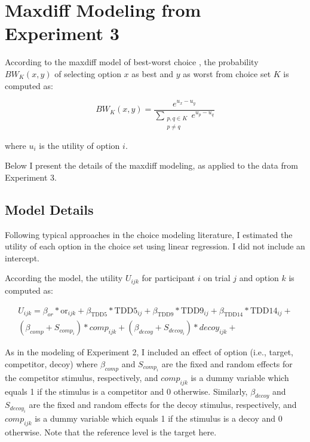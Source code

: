 \chapter{Maxdiff Modeling from Experiment 3}
According to the maxdiff model of best-worst choice \parencite{marleyProbabilisticModelsBest2005}, the probability $BW_{K}(x,y)$ of selecting option $x$ as best and $y$ as worst from choice set $K$ is computed as:

\begin{equation}
   BW_{K}(x,y)=\frac{e^{u_{x}-u_{y}}}{\sum_{\substack{{p,q}\in K\\p \neq q}} e^{u_{p}-u_{q}}}   
   \label{eqn:maxdiff_equation1}
\end{equation}

where $u_{i}$ is the utility of option $i$. 

Below I present the details of the maxdiff modeling, as applied to the data from Experiment 3.

\section{Model Details}
Following typical approaches in the choice modeling literature, I estimated the utility of each option in the choice set using linear regression. I did not include an intercept. 

According the model, the utility $U_{ijk}$ for participant $i$ on trial $j$ and option $k$ is computed as:

\begin{equation}
    \begin{aligned}
        U_{ijk}=\beta_{or}*\mathrm{or}_{ijk} + \beta_{\mathrm{TDD}5}*\mathrm{TDD}5_{ij} +\beta_{\mathrm{TDD}9}*\mathrm{TDD}9_{ij} + \beta_{\mathrm{TDD}14}*\mathrm{TDD}14_{ij}+\\
        (\beta_{comp}+S_{comp_i})*comp_{ijk}+(\beta_{decoy}+S_{decoy_i})*decoy_{ijk}+
        \label{maxdiff_U}
    \end{aligned}
\end{equation}

As in the modeling of Experiment 2, I included an effect of option (i.e., target, competitor, decoy) where $\beta_{comp}$ and $S_{comp_i}$ are the fixed and random effects for the competitor stimulus, respectively, and $comp_{ijk}$ is a dummy variable which equals 1 if the stimulus is a competitor and 0 otherwise. Similarly, $\beta_{decoy}$ and $S_{decoy_i}$ are the fixed and random effects for the decoy stimulus, respectively, and $comp_{ijk}$ is a dummy variable which equals 1 if the stimulus is a decoy and 0 otherwise. Note that the reference level is the target here.


